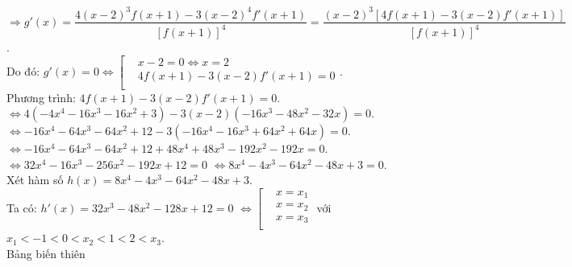 \begin{ex}
{		$\Rightarrow{g}'(x)=\dfrac{4\left(x-2\right)^3f\left(x+1\right)-3\left(x-2\right)^4f'\left(x+1\right)}{\left[f\left(x+1\right)\right]^4}=\dfrac{\left(x-2\right)^3\left[4f\left(x+1\right)-3\left(x-2\right){f}'\left(x+1\right)\right]}{\left[f\left(x+1\right)\right]^4}$.\\
		Do đó: $g'(x)=0\Leftrightarrow\left[\begin{aligned}
			&x-2=0\Leftrightarrow x=2\\ 
			&4f\left(x+1\right)-3\left(x-2\right){f}'\left(x+1\right)=0\\ 
		\end{aligned}\right.$.\\
		Phương trình: $4f\left(x+1\right)-3\left(x-2\right){f}'\left(x+1\right)=0$.\\
		$\Leftrightarrow 4\left(-4x^4-16x^3-16x^2+3\right)-3\left(x-2\right)\left(-16x^3-48x^2-32x\right)=0$.\\
		$\Leftrightarrow-16x^4-64x^3-64x^2+12-3\left(-16x^4-16x^3+64x^2+64x\right)=0$.\\
		$\Leftrightarrow-16x^4-64x^3-64x^2+12+48x^4+48x^3-192x^2-192x=0$.\\
		$\Leftrightarrow 32x^4-16x^3-256x^2-192x+12=0$ $\Leftrightarrow 8x^4-4x^3-64x^2-48x+3=0$.\\
		Xét hàm số $h(x)=8x^4-4x^3-64x^2-48x+3$.\\
		Ta có: $h'(x)=32x^3-48x^2-128x+12=0$ $\Leftrightarrow\left[\begin{aligned}
			&x=x_1\\ 
			&x=x_2\\ 
			&x=x_3\\ 
		\end{aligned}\right.$ với $x_1<-1<0<x_2<1<2<x_3$.\\
		Bảng biến thiên		
		\begin{center}
\end{center}}
\end{ex}
